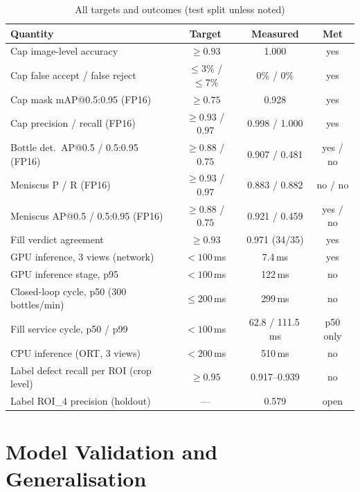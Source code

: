 \begin{table}[htbp]
\centering
\caption{All targets and outcomes (test split unless noted)}
\label{tab:targets}
\begin{tabular}{|l|c|c|c|}
\hline
\textbf{Quantity} & \textbf{Target} & \textbf{Measured} & \textbf{Met} \\ \hline
Cap image-level accuracy & $\geq0.93$ & 1.000 & yes \\ \hline
Cap false accept / false reject & $\leq3\%$ / $\leq7\%$ & 0\% / 0\% & yes \\ \hline
Cap mask mAP@0.5:0.95 (FP16) & $\geq0.75$ & 0.928 & yes \\ \hline
Cap precision / recall (FP16) & $\geq0.93$ / $0.97$ & 0.998 / 1.000 & yes \\ \hline
Bottle det.\ AP@0.5 / 0.5:0.95 (FP16) & $\geq0.88$ / $0.75$ & 0.907 / 0.481 & yes / no \\ \hline
Meniscus P / R (FP16) & $\geq0.93$ / $0.97$ & 0.883 / 0.882 & no / no \\ \hline
Meniscus AP@0.5 / 0.5:0.95 (FP16) & $\geq0.88$ / $0.75$ & 0.921 / 0.459 & yes / no \\ \hline
Fill verdict agreement & $\geq0.93$ & 0.971 (34/35) & yes \\ \hline
GPU inference, 3 views (network) & $<100$\,ms & 7.4\,ms & yes \\ \hline
GPU inference stage, p95 & $<100$\,ms & 122\,ms & no \\ \hline
Closed-loop cycle, p50 (300 bottles/min) & $\leq200$\,ms & 299\,ms & no \\ \hline
Fill service cycle, p50 / p99 & $<100$\,ms & 62.8 / 111.5\,ms & p50 only \\ \hline
CPU inference (ORT, 3 views) & $<200$\,ms & 510\,ms & no \\ \hline
Label defect recall per ROI (crop level) & $\geq0.95$ & 0.917--0.939 & no \\ \hline
Label ROI\_4 precision (holdout) & --- & 0.579 & open \\ \hline
\end{tabular}
\end{table}

\section{Model Validation and Generalisation}
\label{sec:validation}

